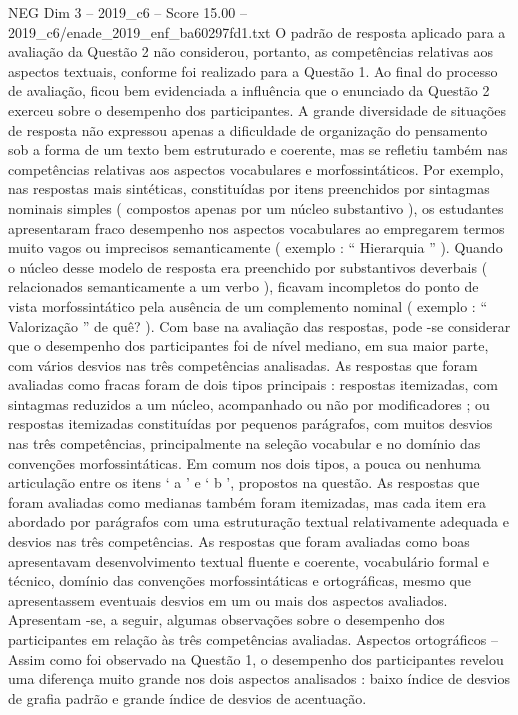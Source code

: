 \begin{textsample}{NEG Dim 3 – 2019\_c6 – Score 15.00 – 2019\_c6/enade\_2019\_enf\_ba60297fd1.txt}
O padrão de resposta aplicado para a avaliação da Questão 2 não considerou, portanto, as competências relativas aos aspectos textuais, conforme foi realizado para a Questão 1.
Ao final do processo de avaliação, ficou bem evidenciada a influência que o enunciado da Questão 2 exerceu sobre o desempenho dos participantes.
A grande diversidade de situações de resposta não expressou apenas a dificuldade de organização do pensamento sob a forma de um texto bem estruturado e coerente, mas se refletiu também nas competências relativas aos aspectos vocabulares e morfossintáticos.
Por exemplo, nas respostas mais sintéticas, constituídas por itens preenchidos por sintagmas nominais simples ( compostos apenas por um núcleo substantivo ), os estudantes apresentaram fraco desempenho nos aspectos vocabulares ao empregarem termos muito vagos ou imprecisos semanticamente ( exemplo : “ Hierarquia ” ).
Quando o núcleo desse modelo de resposta era preenchido por substantivos deverbais ( relacionados semanticamente a um verbo ), ficavam incompletos do ponto de vista morfossintático pela ausência de um complemento nominal ( exemplo : “ Valorização ” de quê? ).
Com base na avaliação das respostas, pode -se considerar que o desempenho dos participantes foi de nível mediano, em sua maior parte, com vários desvios nas três competências analisadas.
As respostas que foram avaliadas como fracas foram de dois tipos principais : respostas itemizadas, com sintagmas reduzidos a um núcleo, acompanhado ou não por modificadores ; ou respostas itemizadas constituídas por pequenos parágrafos, com muitos desvios nas três competências, principalmente na seleção vocabular e no domínio das convenções morfossintáticas.
Em comum nos dois tipos, a pouca ou nenhuma articulação entre os itens ‘ a ’ e ‘ b ’, propostos na questão.
As respostas que foram avaliadas como medianas também foram itemizadas, mas cada item era abordado por parágrafos com uma estruturação textual relativamente adequada e desvios nas três competências.
As respostas que foram avaliadas como boas apresentavam desenvolvimento textual fluente e coerente, vocabulário formal e técnico, domínio das convenções morfossintáticas e ortográficas, mesmo que apresentassem eventuais desvios em um ou mais dos aspectos avaliados.
Apresentam -se, a seguir, algumas observações sobre o desempenho dos participantes em relação às três competências avaliadas.
Aspectos ortográficos – Assim como foi observado na Questão 1, o desempenho dos participantes revelou uma diferença muito grande nos dois aspectos analisados : baixo índice de desvios de grafia padrão e grande índice de desvios de acentuação.

\end{textsample}

